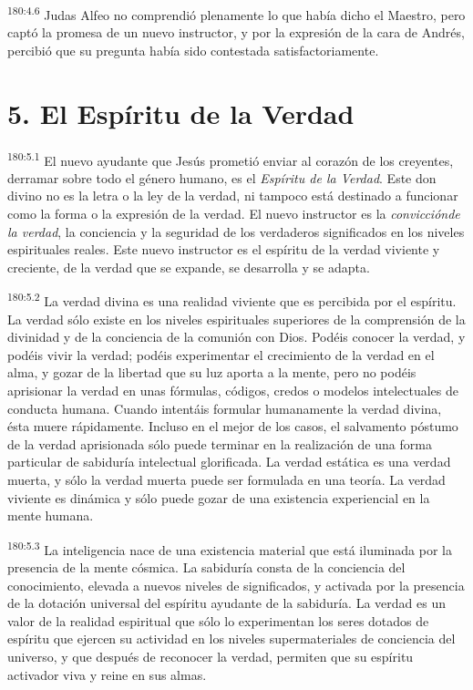 \par 
\textsuperscript{180:4.6} Judas Alfeo no comprendió plenamente lo que había dicho el Maestro, pero captó la promesa de un nuevo instructor, y por la expresión de la cara de Andrés, percibió que su pregunta había sido contestada satisfactoriamente.

\section*{5. El Espíritu de la Verdad}
\par 
\textsuperscript{180:5.1} El nuevo ayudante que Jesús prometió enviar al corazón de los creyentes, derramar sobre todo el género humano, es el \textit{Espíritu de la Verdad}. Este don divino no es la letra o la ley de la verdad, ni tampoco está destinado a funcionar como la forma o la expresión de la verdad. El nuevo instructor es la \textit{convicciónde la verdad}, la conciencia y la seguridad de los verdaderos significados en los niveles espirituales reales. Este nuevo instructor es el espíritu de la verdad viviente y creciente, de la verdad que se expande, se desarrolla y se adapta.

\par 
\textsuperscript{180:5.2} La verdad divina es una realidad viviente que es percibida por el espíritu. La verdad sólo existe en los niveles espirituales superiores de la comprensión de la divinidad y de la conciencia de la comunión con Dios. Podéis conocer la verdad, y podéis vivir la verdad; podéis experimentar el crecimiento de la verdad en el alma, y gozar de la libertad que su luz aporta a la mente, pero no podéis aprisionar la verdad en unas fórmulas, códigos, credos o modelos intelectuales de conducta humana. Cuando intentáis formular humanamente la verdad divina, ésta muere rápidamente. Incluso en el mejor de los casos, el salvamento póstumo de la verdad aprisionada sólo puede terminar en la realización de una forma particular de sabiduría intelectual glorificada. La verdad estática es una verdad muerta, y sólo la verdad muerta puede ser formulada en una teoría. La verdad viviente es dinámica y sólo puede gozar de una existencia experiencial en la mente humana.

\par 
\textsuperscript{180:5.3} La inteligencia nace de una existencia material que está iluminada por la presencia de la mente cósmica. La sabiduría consta de la conciencia del conocimiento, elevada a nuevos niveles de significados, y activada por la presencia de la dotación universal del espíritu ayudante de la sabiduría. La verdad es un valor de la realidad espiritual que sólo lo experimentan los seres dotados de espíritu que ejercen su actividad en los niveles supermateriales de conciencia del universo, y que después de reconocer la verdad, permiten que su espíritu activador viva y reine en sus almas.

